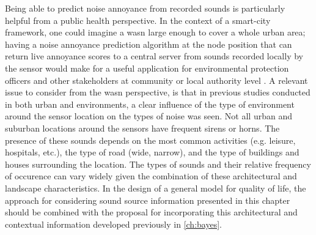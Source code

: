 Being able to predict noise annoyance from recorded sounds is particularly helpful from a public health perspective. In the context of a smart-city framework, one could imagine a \gls{wasn} large enough to cover a whole urban area; having a noise annoyance prediction algorithm at the node position that can return live annoyance scores to a central server from sounds recorded locally by the sensor would make for a useful application for environmental protection officers and other stakeholders at community or local authority level \citep{Kang2018Impact}. A relevant issue to consider from the \gls{wasn} perspective, is that in previous studies conducted in both urban \citep{Alias2020WASN} and \citep{Alias2020Aggregate} environments, a clear influence of the type of environment around the sensor location on the types of noise was seen. Not all urban and suburban locations around the sensors have frequent sirens or horns. The presence of these sounds depends on the most common activities (e.g. leisure, hospitals, etc.), the type of road (wide, narrow), and the type of buildings and houses surrounding the location. The types of sounds and their relative frequency of occurence can vary widely given the combination of these architectural and landscape characteristics. In the design of a general model for quality of life, the approach for considering sound source information presented in this chapter should be combined with the proposal for incorporating this architectural and contextual information developed previously in \cref{ch:bayes}.



